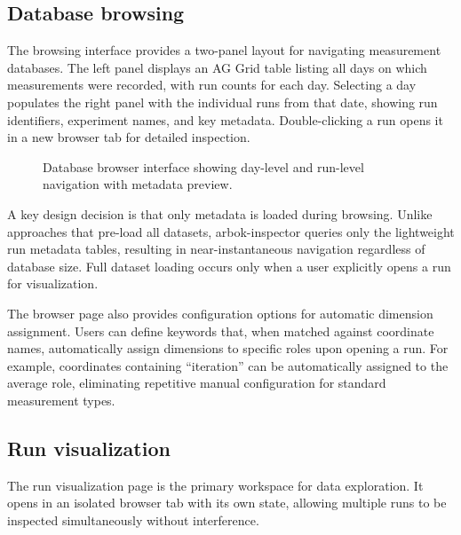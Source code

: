 \subsection{Database browsing}

The browsing interface provides a two-panel layout for navigating measurement databases.
The left panel displays an AG Grid table listing all days on which measurements were recorded, with run counts for each day.
Selecting a day populates the right panel with the individual runs from that date, showing run identifiers, experiment names, and key metadata.
Double-clicking a run opens it in a new browser tab for detailed inspection.


\begin{figure}[H]
\caption{Database browser interface showing day-level and run-level navigation with metadata preview.}
\label{fig:inspector_browser}
\end{figure}

A key design decision is that only metadata is loaded during browsing.
Unlike approaches that pre-load all datasets, arbok-inspector queries only the lightweight run metadata tables, resulting in near-instantaneous navigation regardless of database size.
Full dataset loading occurs only when a user explicitly opens a run for visualization.

The browser page also provides configuration options for automatic dimension assignment.
Users can define keywords that, when matched against coordinate names, automatically assign dimensions to specific roles upon opening a run.
For example, coordinates containing ``iteration'' can be automatically assigned to the average role, eliminating repetitive manual configuration for standard measurement types.

\subsection{Run visualization}

The run visualization page is the primary workspace for data exploration.
It opens in an isolated browser tab with its own state, allowing multiple runs to be inspected simultaneously without interference.

